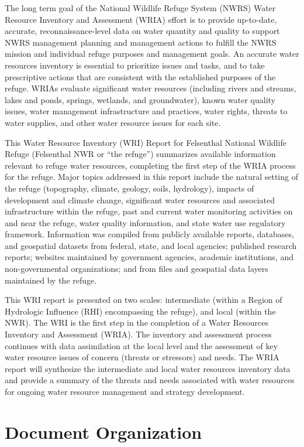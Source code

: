 \documentclass[]{book}
\begin{document}
The long term goal of the National Wildlife Refuge System (NWRS) Water
Resource Inventory and Assessment (WRIA) effort is to provide
up-to-date, accurate, reconnaissance-level data on water quantity and
quality to support NWRS management planning and management actions to
fulfill the NWRS mission and individual refuge purposes and management
goals. An accurate water resources inventory is essential to prioritize
issues and tasks, and to take prescriptive actions that are consistent
with the established purposes of the refuge. WRIAs evaluate significant
water resources (including rivers and streams, lakes and ponds, springs,
wetlands, and groundwater), known water quality issues, water management
infrastructure and practices, water rights, threats to water supplies,
and other water resource issues for each site.

This Water Resource Inventory (WRI) Report for Felsenthal National
Wildlife Refuge (Felsenthal NWR or ``the refuge'') summarizes available
information relevant to refuge water resources, completing the first
step of the WRIA process for the refuge. Major topics addressed in this
report include the natural setting of the refuge (topography, climate,
geology, soils, hydrology), impacts of development and climate change,
significant water resources and associated infrastructure within the
refuge, past and current water monitoring activities on and near the
refuge, water quality information, and state water use regulatory
framework. Information was compiled from publicly available reports,
databases, and geospatial datasets from federal, state, and local
agencies; published research reports; websites maintained by government
agencies, academic institutions, and non-governmental organizations; and
from files and geospatial data layers maintained by the refuge.

This WRI report is presented on two scales: intermediate (within a
Region of Hydrologic Influence (RHI) encompassing the refuge), and local
(within the NWR). The WRI is the first step in the completion of a Water
Resources Inventory and Assessment (WRIA). The inventory and assessment
process continues with data assimilation at the local level and the
assessment of key water resource issues of concern (threats or
stressors) and needs. The WRIA report will synthesize the intermediate
and local water resources inventory data and provide a summary of the
threats and needs associated with water resources for ongoing water
resource management and strategy development.

\section{Document Organization}\label{document-organization}
\end{document}
